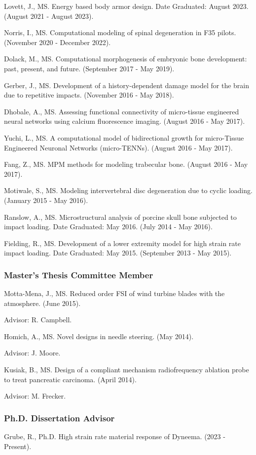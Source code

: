 \documentclass[a4paper,10pt]{article}
\begin{document}
Lovett, J., MS. Energy based body armor design. Date Graduated: August 2023. (August 2021 - August 2023).

Norris, I., MS. Computational modeling of spinal degeneration in F35 pilots. (November 2020 - December 2022).

Dolack, M., MS. Computational morphogenesis of embryonic bone development: past, present, and future. (September 2017 - May 2019).

Gerber, J., MS. Development of a history-dependent damage model for the brain due to repetitive impacts. (November 2016 - May 2018).

Dhobale, A., MS. Assessing functional connectivity of micro-tissue engineered neural networks using calcium fluorescence imaging. (August 2016 - May 2017).

Yuchi, L., MS. A computational model of bidirectional growth for micro-Tissue Engineered Neuronal Networks (micro-TENNs). (August 2016 - May 2017).

Fang, Z., MS. MPM methods for modeling trabecular bone. (August 2016 - May 2017).

Motiwale, S., MS. Modeling intervertebral disc degeneration due to cyclic loading. (January 2015 - May 2016).

Ranslow, A., MS. Microstructural analysis of porcine skull bone subjected to impact loading. Date Graduated: May 2016. (July 2014 - May 2016).

Fielding, R., MS. Development of a lower extremity model for high strain rate impact loading. Date Graduated: May 2015. (September 2013 - May 2015).



\subsubsection*{Master's Thesis Committee Member}
Motta-Mena, J., MS. Reduced order FSI of wind turbine blades with the atmosphere. (June 2015).

Advisor: R. Campbell.

Homich, A., MS. Novel designs in needle steering. (May 2014).

Advisor: J. Moore.

Kusiak, B., MS. Design of a compliant mechanism radiofrequency ablation probe to treat pancreatic carcinoma. (April 2014).

Advisor: M. Frecker.



\subsubsection*{Ph.D. Dissertation Advisor}
Grube, R., Ph.D. High strain rate material response of Dyneema. (2023 - Present).
\end{document}
